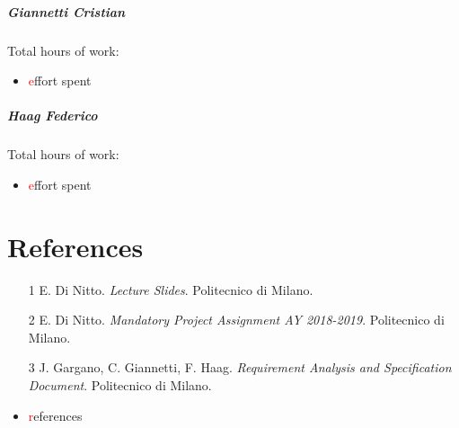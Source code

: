 \documentclass{report}
\newcommand\todo[1]{\textcolor{red}{#1}}
\newcommand{\ic}[1]{\textit{#1}}
\begin{document}
		\paragraph{Giannetti Cristian} Total hours of work: 
			\begin{itemize}
				\item\todo effort spent
			\end{itemize}
		\paragraph{Haag Federico} Total hours of work: 
			\begin{itemize}
				\item \todo effort spent
			\end{itemize}
			
	\chapter{References}
	\thispagestyle{fancy}
	\begin{itemize}
		\item [1]\label{ref:1} E. Di Nitto. \ic{Lecture Slides}. Politecnico di Milano.
		\item [2]\label{ref:2} E. Di Nitto. \ic{Mandatory Project Assignment AY 2018-2019}. Politecnico di Milano.
		\item [3]\label{ref:3} J. Gargano, C. Giannetti, F. Haag. \ic{Requirement Analysis and Specification Document}. Politecnico di Milano.
		\item \todo references
	\end{itemize}
	
\end{document}
